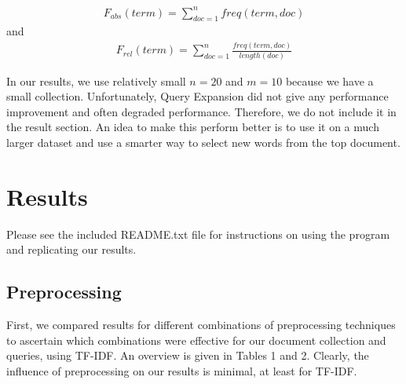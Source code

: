 \documentclass{article}
\begin{document}
\begin{align*}
F_{abs}(term) = \sum_{doc=1}^{n}freq(term,doc)
\end{align*}
and
\begin{align*}
F_{rel}(term) = \sum_{doc=1}^{n}\frac{freq(term,doc)}{length(doc)}
\end{align*}

In our results, we use relatively small $n = 20$ and $m = 10$ because we have a small collection. Unfortunately, Query Expansion did not give any performance improvement and often degraded performance. Therefore, we do not include it in the result section. An idea to make this perform better is to use it on a much larger dataset and use a smarter way to select new words from the top document.

\section*{Results}

Please see the included README.txt file for instructions on using the program and replicating our results.

\subsection*{Preprocessing}

First, we compared results for different combinations of preprocessing techniques to ascertain which combinations were effective for our document collection and queries, using TF-IDF. An overview is given in Tables 1 and 2. Clearly, the influence of preprocessing on our results is minimal, at least for TF-IDF.
\end{document}
